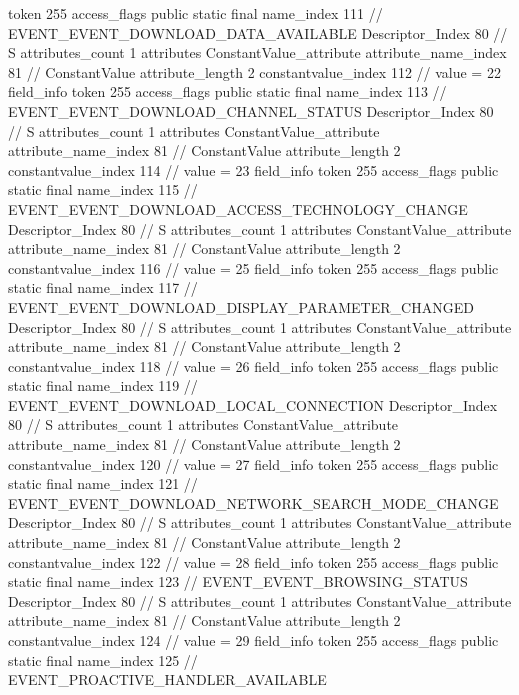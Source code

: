 {{{{{				token	255
				access_flags	public static final
				name_index	111		// EVENT_EVENT_DOWNLOAD_DATA_AVAILABLE
				Descriptor_Index	80		// S
				attributes_count	1
				attributes {
				ConstantValue_attribute {
					attribute_name_index	81		// ConstantValue
					attribute_length	2
					constantvalue_index	112		// value = 22
				}
				}
			}
			field_info {
				token	255
				access_flags	public static final
				name_index	113		// EVENT_EVENT_DOWNLOAD_CHANNEL_STATUS
				Descriptor_Index	80		// S
				attributes_count	1
				attributes {
				ConstantValue_attribute {
					attribute_name_index	81		// ConstantValue
					attribute_length	2
					constantvalue_index	114		// value = 23
				}
				}
			}
			field_info {
				token	255
				access_flags	public static final
				name_index	115		// EVENT_EVENT_DOWNLOAD_ACCESS_TECHNOLOGY_CHANGE
				Descriptor_Index	80		// S
				attributes_count	1
				attributes {
				ConstantValue_attribute {
					attribute_name_index	81		// ConstantValue
					attribute_length	2
					constantvalue_index	116		// value = 25
				}
				}
			}
			field_info {
				token	255
				access_flags	public static final
				name_index	117		// EVENT_EVENT_DOWNLOAD_DISPLAY_PARAMETER_CHANGED
				Descriptor_Index	80		// S
				attributes_count	1
				attributes {
				ConstantValue_attribute {
					attribute_name_index	81		// ConstantValue
					attribute_length	2
					constantvalue_index	118		// value = 26
				}
				}
			}
			field_info {
				token	255
				access_flags	public static final
				name_index	119		// EVENT_EVENT_DOWNLOAD_LOCAL_CONNECTION
				Descriptor_Index	80		// S
				attributes_count	1
				attributes {
				ConstantValue_attribute {
					attribute_name_index	81		// ConstantValue
					attribute_length	2
					constantvalue_index	120		// value = 27
				}
				}
			}
			field_info {
				token	255
				access_flags	public static final
				name_index	121		// EVENT_EVENT_DOWNLOAD_NETWORK_SEARCH_MODE_CHANGE
				Descriptor_Index	80		// S
				attributes_count	1
				attributes {
				ConstantValue_attribute {
					attribute_name_index	81		// ConstantValue
					attribute_length	2
					constantvalue_index	122		// value = 28
				}
				}
			}
			field_info {
				token	255
				access_flags	public static final
				name_index	123		// EVENT_EVENT_BROWSING_STATUS
				Descriptor_Index	80		// S
				attributes_count	1
				attributes {
				ConstantValue_attribute {
					attribute_name_index	81		// ConstantValue
					attribute_length	2
					constantvalue_index	124		// value = 29
				}
				}
			}
			field_info {
				token	255
				access_flags	public static final
				name_index	125		// EVENT_PROACTIVE_HANDLER_AVAILABLE
}}}}}
